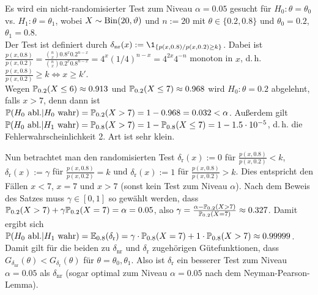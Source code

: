 \linie
\pagebreak

\begin{Bsp}
    Es wird ein nicht-randomisierter Test zum Niveau $\alpha = 0.05$ gesucht für
    $H_0\colon \theta = \theta_0$ vs. $H_1\colon \theta = \theta_1$, wobei
    $X \sim \operatorname{Bin}(20, \vartheta)$ und $n := 20$ mit $\theta \in \{0.2, 0.8\}$ und
    $\theta_0 = 0.2$, $\theta_1 = 0.8$.\\
    Der Test ist definiert durch $\delta_{\text{nr}}(x) := \1_{\{p(x, 0.8)/p(x, 0.2) \ge k\}}$.
    Dabei ist\\$\frac{p(x, 0.8)}{p(x, 0.2)} =
    \frac{\binom{n}{x} 0.8^x 0.2^{n-x}}{\binom{n}{x} 0.2^x 0.8^{n-x}}
    = 4^x (1/4)^{n-x} = 4^{2x} 4^{-n}$ monoton in $x$,
    d.\,h. $\frac{p(x, 0.8)}{p(x, 0.2)} \ge k \iff x \ge k'$.\\
    Wegen $\mathbb{P}_{0.2}(X \le 6) \approx 0.913$ und $\mathbb{P}_{0.2}(X \le 7) \approx 0.968$ wird
    $H_0\colon \theta = 0.2$ abgelehnt, falls $x > 7$,
    denn dann ist $\mathbb{P}(H_0 \text{ abl.} | H_0 \text{ wahr}) = \mathbb{P}_{0.2}(X > 7)
    = 1 - 0.968 = 0.032 < \alpha$.
    Außerdem gilt $\mathbb{P}(H_0 \text{ abl.} | H_1 \text{ wahr}) = \mathbb{P}_{0.8}(X > 7)
    = 1 - \mathbb{P}_{0.8}(X \le 7) = 1 - 1.5 \cdot 10^{-5}$,
    d.\,h. die Fehlerwahrscheinlichkeit 2. Art ist sehr klein.
    
    Nun betrachtet man den randomisierten Test
    $\delta_{\text{r}}(x) := 0$ für $\frac{p(x, 0.8)}{p(x, 0.2)} < k$,
    $\delta_{\text{r}}(x) := \gamma$ für $\frac{p(x, 0.8)}{p(x, 0.2)} = k$ und
    $\delta_{\text{r}}(x) := 1$ für $\frac{p(x, 0.8)}{p(x, 0.2)} > k$.
    Dies entspricht den Fällen $x < 7$, $x = 7$ und $x > 7$
    (sonst kein Test zum Niveau $\alpha$).
    Nach dem Beweis des Satzes muss $\gamma \in [0, 1]$ so gewählt werden, dass
    $\mathbb{P}_{0.2}(X > 7) + \gamma \mathbb{P}_{0.2}(X = 7) = \alpha = 0.05$,
    also $\gamma = \frac{\alpha - \mathbb{P}_{0.2}(X > 7)}{\mathbb{P}_{0.2}(X = 7)} \approx 0.327$.
    Damit ergibt sich
    $\mathbb{P}(H_0 \text{ abl.} | H_1 \text{ wahr}) = \mathbb{E}_{0.8}(\delta_{\text{r}})
    = \gamma \cdot \mathbb{P}_{0.8}(X = 7) + 1 \cdot \mathbb{P}_{0.8}(X > 7) \approx 0.99999$.
    Damit gilt für die beiden zu $\delta_{\text{nr}}$ und $\delta_{\text{r}}$ zugehörigen
    Gütefunktionen, dass
    $G_{\delta_{\text{nr}}}(\theta) < G_{\delta_{\text{r}}}(\theta)$ für
    $\theta = \theta_0, \theta_1$.
    Also ist $\delta_{\text{r}}$ ein besserer Test zum Niveau $\alpha = 0.05$
    als $\delta_{\text{nr}}$ (sogar optimal zum Niveau $\alpha = 0.05$ nach dem
    Neyman-Pearson-Lemma).
\end{Bsp}

